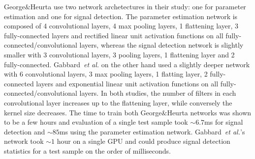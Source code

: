 %
%
George$\&$Heurta use two network archetectures in their 
study: one for parameter estimation and one for signal 
detection. The parameter estimation network is composed of 4 convolutional 
layers, 4 max pooling layers, 1 flattening layer, 3 fully-connected 
layers and rectified linear unit activation functions on all 
fully-connected/convolutional layers, whereas the signal detection 
network is slightly smaller with 3 convolutional layers, 3 pooling 
layers, 1 flattening layer and 2 fully-connected. Gabbard~\textit{et al.} 
on the other hand used a slightly deeper network 
with 6 convolutional layers, 3 max pooling layers, 1 flatting 
layer, 2 fully-connected 
layers and exponential linear unit activation functions on all 
fully-connected/convolutional layers. In both studies, the number 
of filters in each convolutional layer increases up to the flattening 
layer, while conversely the kernel size decreases. The time to train 
both George$\&$Heurta networks was shown to be a few hours and 
evaluation of a single test sample took $\sim 6.7$ms for signal detection 
and $\sim 85$ms using the parameter estimation network. 
Gabbard~\textit{et al.}'s network took $\sim 1$ hour on a single 
\ac{GPU} and could produce signal detection statistics for a 
test sample on the order of milliseconds.

%
%


